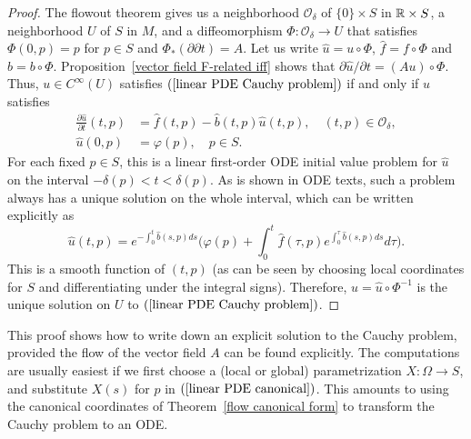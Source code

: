 \begin{proof}
The flowout theorem gives us a neighborhood $\mathcal{O}_\delta$ of $\{0\}\times S$ in $\mathbb{R}\times S$, a neighborhood $U$ of $S$ in $M$, and a diffeomorphism $\varPhi:\mathcal{O}_\delta\to U$ that satisfies $\varPhi(0,p)=p$ for $p\in S$ and $\varPhi_*(\partial\partial t)=A$. Let us write $\widehat{u}=u\circ\varPhi$, $\widehat{f}=f\circ\varPhi$ and $\widehat{b}=b\circ\varPhi$. Proposition~\ref{vector field F-related iff} shows that $\partial\widehat{u}/\partial t=(Au)\circ\varPhi$. Thus, $u\in C^\infty(U)$ satisfies $(\ref{linear PDE Cauchy problem})$ if and only if $\widehat{u}$ satisfies
\begin{equation}\label{linear PDE canonical}
\begin{aligned}
\frac{\partial\widehat{u}}{\partial t}(t,p)&=\widehat{f}(t,p)-\widehat{b}(t,p)\widehat{u}(t,p),\quad(t,p)\in\mathcal{O}_\delta,\\
\widehat{u}(0,p)&=\varphi(p),\quad p\in S.
\end{aligned}
\end{equation}
For each fixed $p\in S$, this is a linear first-order ODE initial value problem for $\widehat{u}$ on the interval $-\delta(p)<t<\delta(p)$. As is shown in ODE texts, such a problem always has a unique solution on the whole interval, which can be written explicitly as
\[\widehat{u}(t,p)=e^{-\int_0^{t}\widehat{b}(s,p)ds}\Big(\varphi(p)+\int_0^t\widehat{f}(\tau,p)e^{\int_0^{\tau}\widehat{b}(s,p)ds}d\tau\Big).\]
This is a smooth function of $(t,p)$ (as can be seen by choosing local coordinates for $S$ and differentiating under the integral signs). Therefore, $u=\widehat{u}\circ\varPhi^{-1}$ is the unique solution on $U$ to $(\ref{linear PDE Cauchy problem})$.
\end{proof}
This proof shows how to write down an explicit solution to the Cauchy problem, provided the flow of the vector field $A$ can be found explicitly. The computations are usually easiest if we first choose a (local or global) parametrization $X:\Omega\to S$, and substitute $X(s)$ for $p$ in $(\ref{linear PDE canonical})$. This amounts to using the canonical coordinates of Theorem~\ref{flow canonical form} to transform the Cauchy problem to an ODE.

